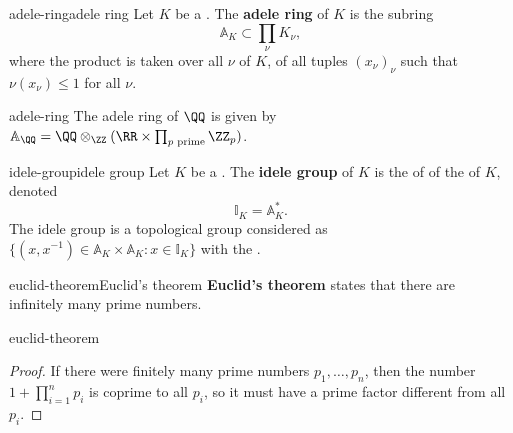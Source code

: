 \begin{topic}{adele-ring}{adele ring}
    Let $K$ be a . The \textbf{adele ring} of $K$ is the subring
    \[ \mathbb{A}_K \subset \prod_{\nu} K_\nu , \]
    where the product is taken over all  $\nu$ of $K$, of all tuples $(x_\nu)_\nu$ such that $\nu(x_\nu) \le 1$ for all  $\nu$.
\end{topic}

\begin{example}{adele-ring}
    The adele ring of $\QQ$ is given by $\mathbb{A}_\QQ = \QQ \otimes_\ZZ (\RR \times \prod_{p \textup{ prime}} \ZZ_p)$.
\end{example}

\begin{topic}{idele-group}{idele group}
    Let $K$ be a . The \textbf{idele group} of $K$ is the  of  of the  of $K$, denoted
    \[ \mathbb{I}_K = \mathbb{A}_K^* . \]
    The idele group is a topological group considered as $\{ (x, x^{-1}) \in \mathbb{A}_K \times \mathbb{A}_K : x \in \mathbb{I}_K \}$ with the .
\end{topic}

\begin{topic}{euclid-theorem}{Euclid's theorem}
    \textbf{Euclid's theorem} states that there are infinitely many prime numbers.
\end{topic}

\begin{example}{euclid-theorem}
    \begin{proof}
        If there were finitely many prime numbers $p_1, \ldots, p_n$, then the number $1 + \prod_{i = 1}^{n} p_i$ is coprime to all $p_i$, so it must have a prime factor different from all $p_i$.
    \end{proof}
\end{example}
